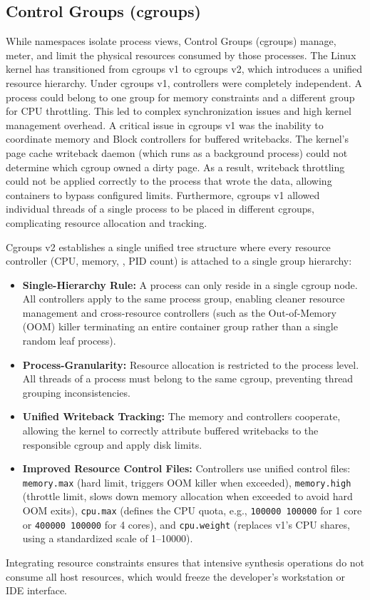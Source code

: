 \subsection{Control Groups (cgroups)}
While namespaces isolate process views, Control Groups (cgroups) manage, meter, and limit the physical resources consumed by those processes. The Linux kernel has transitioned from cgroups v1 to cgroups v2, which introduces a unified resource hierarchy.
Under cgroups v1, controllers were completely independent. A process could belong to one group for memory constraints and a different group for CPU throttling. This led to complex synchronization issues and high kernel management overhead. A critical issue in cgroups v1 was the inability to coordinate memory and Block  controllers for buffered  writebacks. The kernel's page cache writeback daemon (which runs as a background process) could not determine which cgroup owned a dirty page. As a result, writeback  throttling could not be applied correctly to the process that wrote the data, allowing containers to bypass configured  limits. Furthermore, cgroups v1 allowed individual threads of a single process to be placed in different cgroups, complicating resource allocation and tracking.

Cgroups v2 establishes a single unified tree structure where every resource controller (CPU, memory, , PID count) is attached to a single group hierarchy:
\begin{itemize}
    \item \textbf{Single-Hierarchy Rule:} A process can only reside in a single cgroup node. All controllers apply to the same process group, enabling cleaner resource management and cross-resource controllers (such as the Out-of-Memory (OOM) killer terminating an entire container group rather than a single random leaf process).
    \item \textbf{Process-Granularity:} Resource allocation is restricted to the process level. All threads of a process must belong to the same cgroup, preventing thread grouping inconsistencies.
    \item \textbf{Unified Writeback Tracking:} The memory and  controllers cooperate, allowing the kernel to correctly attribute buffered  writebacks to the responsible cgroup and apply disk  limits.
    \item \textbf{Improved Resource Control Files:} Controllers use unified control files: \texttt{memory.max} (hard limit, triggers OOM killer when exceeded), \texttt{memory.high} (throttle limit, slows down memory allocation when exceeded to avoid hard OOM exits), \texttt{cpu.max} (defines the CPU quota, e.g., \texttt{100000\ 100000} for 1 core or \texttt{400000\ 100000} for 4 cores), and \texttt{cpu.weight} (replaces v1's CPU shares, using a standardized scale of \numrange{1}{10000}).
\end{itemize}
Integrating resource constraints ensures that intensive synthesis operations do not consume all host resources, which would freeze the developer's workstation or IDE interface.

